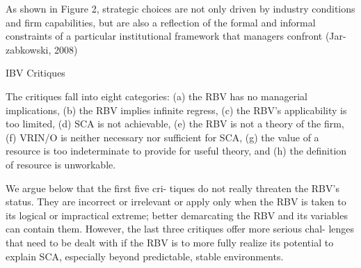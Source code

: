 As shown in Figure 2, strategic choices are not only driven by industry conditions and firm capabilities, but are also a reflection of the formal and informal constraints of a particular institutional framework that managers confront (Jar- zabkowski, 2008)



IBV Critiques

The critiques fall into eight categories: 
(a) the RBV has no managerial implications, 
(b) the RBV implies infinite regress, 
(c) the RBV’s applicability is too limited, 
(d) SCA is not achievable, 
(e) the RBV is not a theory of the firm, 
(f) VRIN/O is neither necessary nor sufficient for SCA, 
(g) the value of a resource is too indeterminate to provide for useful theory, and 
(h) the definition of resource is unworkable.


 We argue below that the first five cri- tiques do not really threaten the RBV’s status. They are incorrect or irrelevant or apply only when the RBV is taken to its logical or impractical extreme; better demarcating the RBV and its variables can contain them. However, the last three critiques offer more serious chal- lenges that need to be dealt with if the RBV is to more fully realize its potential to explain SCA, especially beyond predictable, stable environments.